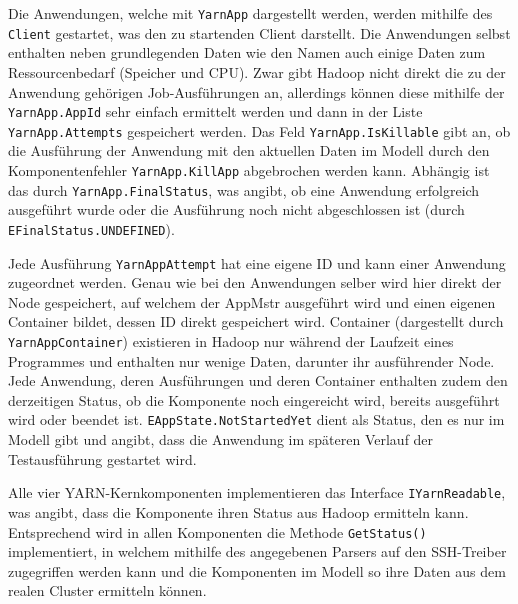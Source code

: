 Die Anwendungen, welche mit \texttt{YarnApp} dargestellt werden, werden mithilfe des \texttt{Client} gestartet, was den zu startenden Client darstellt. Die Anwendungen selbst enthalten neben grundlegenden Daten wie \zB den Namen auch einige Daten zum Ressourcenbedarf (Speicher und CPU). Zwar gibt Hadoop nicht direkt die zu der Anwendung gehörigen Job-Ausführungen an, allerdings können diese mithilfe der \texttt{YarnApp.AppId} sehr einfach ermittelt werden und dann in der Liste \texttt{YarnApp.Attempts} gespeichert werden. Das Feld \texttt{YarnApp.IsKillable} gibt an, ob die Ausführung der Anwendung mit den aktuellen Daten im Modell durch den Komponentenfehler \texttt{YarnApp.KillApp} abgebrochen werden kann. Abhängig ist das durch \texttt{YarnApp.FinalStatus}, was angibt, ob eine Anwendung erfolgreich ausgeführt wurde oder die Ausführung noch nicht abgeschlossen ist (durch \texttt{EFinalStatus.UNDEFINED}).

Jede Ausführung \texttt{YarnAppAttempt} hat eine eigene ID und kann einer Anwendung zugeordnet werden. Genau wie bei den Anwendungen selber wird hier direkt der Node gespeichert, auf welchem der \ac{AppMstr} ausgeführt wird und einen eigenen Container bildet, dessen ID direkt gespeichert wird. Container (dargestellt durch \texttt{YarnAppContainer}) existieren in Hadoop nur während der Laufzeit eines Programmes und enthalten nur wenige Daten, darunter ihr ausführender Node. Jede Anwendung, deren Ausführungen und deren Container enthalten zudem den derzeitigen Status, ob die Komponente noch eingereicht wird, bereits ausgeführt wird oder beendet ist. \texttt{EAppState.NotStartedYet} dient als Status, den es nur im Modell gibt und angibt, dass die Anwendung im späteren Verlauf der Testausführung gestartet wird.

Alle vier YARN-Kernkomponenten implementieren das Interface \texttt{IYarnReadable}, was angibt, dass die Komponente ihren Status aus Hadoop ermitteln kann. Entsprechend wird in allen Komponenten die Methode \texttt{GetStatus()} implementiert, in welchem mithilfe des angegebenen Parsers auf den SSH-Treiber zugegriffen werden kann und die Komponenten im Modell so ihre Daten aus dem realen Cluster ermitteln können.
